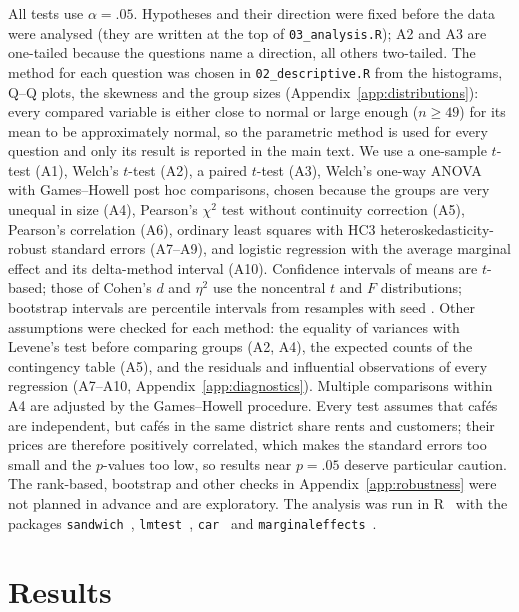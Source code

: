 \documentclass[11pt,a4paper]{article}
\begin{document}
All tests use $\alpha = .05$. Hypotheses and their direction were fixed before the data were analysed (they are written at the top of \texttt{03\_analysis.R}); A2 and A3 are one-tailed because the questions name a direction, all others two-tailed. The method for each question was chosen in \texttt{02\_descriptive.R} from the histograms, Q--Q plots, the skewness and the group sizes (Appendix~\ref{app:distributions}): every compared variable is either close to normal or large enough ($n \ge 49$) for its mean to be approximately normal, so the parametric method is used for every question and only its result is reported in the main text. We use a one-sample $t$-test (A1), Welch's $t$-test (A2), a paired $t$-test (A3), Welch's one-way ANOVA with Games--Howell post hoc comparisons, chosen because the groups are very unequal in size (A4), Pearson's $\chi^2$ test without continuity correction (A5), Pearson's correlation (A6), ordinary least squares with HC3 heteroskedasticity-robust standard errors (A7--A9), and logistic regression with the average marginal effect and its delta-method interval (A10). Confidence intervals of means are $t$-based; those of Cohen's $d$ and $\eta^2$ use the noncentral $t$ and $F$ distributions; bootstrap intervals are percentile intervals from \Boot{} resamples with seed \Seed. Other assumptions were checked for each method: the equality of variances with Levene's test before comparing groups (A2, A4), the expected counts of the contingency table (A5), and the residuals and influential observations of every regression (A7--A10, Appendix~\ref{app:diagnostics}). Multiple comparisons within A4 are adjusted by the Games--Howell procedure. Every test assumes that caf\'es are independent, but caf\'es in the same district share rents and customers; their prices are therefore positively correlated, which makes the standard errors too small and the $p$-values too low, so results near $p = .05$ deserve particular caution. The rank-based, bootstrap and other checks in Appendix~\ref{app:robustness} were not planned in advance and are exploratory. The analysis was run in R~\Rversion{} with the packages \texttt{sandwich}~\Versandwich, \texttt{lmtest}~\Verlmtest, \texttt{car}~\Vercar{} and \texttt{marginaleffects}~\Vermarginaleffects.

\section{Results}
\end{document}
